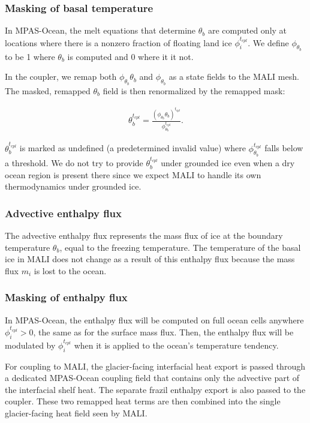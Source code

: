\documentclass[11pt]{report}
\newcommand{\bea}{\begin{eqnarray}}
\newcommand{\eea}{\end{eqnarray}}
\begin{document}
\subsubsection{Masking of basal temperature}

In MPAS-Ocean, the melt equations that determine $\theta_b$ are computed only at locations where there is a nonzero fraction of floating land ice $\phi_i^{t_{cpl}}$.  We define $\phi_{\theta_b}$ to be 1 where $\theta_b$ is computed and 0 where it it not.

In the coupler, we remap both $\phi_{\theta_b} \theta_b$ and $\phi_{\theta_b}$ as a state fields to the MALI mesh.  The masked, remapped $\theta_b$ field is then renormalized by the remapped mask:

\bea
    \theta_b^{t_{cpl}} = \frac{\left(\phi_{\theta_b} \theta_b\right)^{t_{cpl}}}{\phi_{\theta_b}^{t_{cpl}}}.
\eea

$\theta_b^{t_{cpl}}$ is marked as undefined (a predetermined invalid value) where $\phi_{\theta_b}^{t_{cpl}}$ falls below a threshold.  We do not try to provide $\theta_b^{t_{cpl}}$ under grounded ice even when a dry ocean region is present there since we expect MALI to handle its own thermodynamics under grounded ice.

\subsubsection{Advective enthalpy flux}

The advective enthalpy flux represents the mass flux of ice at the boundary temperature $\theta_b$, equal to the freezing temperature. The temperature of the basal ice in MALI does not change as a result of this enthalpy flux because the mass flux $m_i$ is lost to the ocean.

\subsubsection{Masking of enthalpy flux}

In MPAS-Ocean, the enthalpy flux will be computed on full ocean cells anywhere $\phi_i^{t_{cpl}} > 0$, the same as for the surface mass flux.  Then, the enthalpy flux will be modulated by $\phi_i^{t_{cpl}}$ when it is applied to the ocean's temperature tendency.

For coupling to MALI, the glacier-facing interfacial heat export is passed through a
dedicated MPAS-Ocean coupling field that contains only the advective part of the
interfacial shelf heat.  The separate frazil enthalpy export is also passed to the
coupler.  These two remapped heat terms are then combined into the single
glacier-facing heat field seen by MALI.
\end{document}
